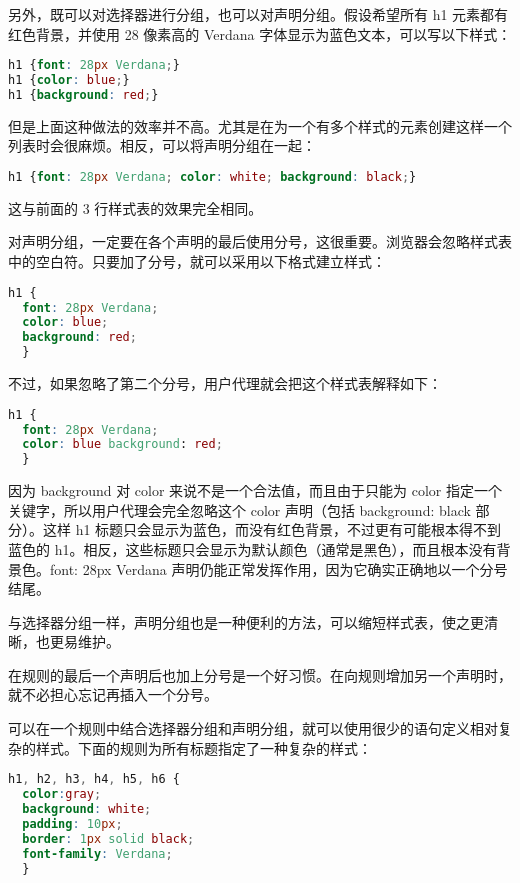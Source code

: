 另外，既可以对选择器进行分组，也可以对声明分组。假设希望所有 h1 元素都有红色背景，并使用 28 像素高的 Verdana 字体显示为蓝色文本，可以写以下样式：

\begin{lstlisting}[language=CSS]
h1 {font: 28px Verdana;}
h1 {color: blue;}
h1 {background: red;}
\end{lstlisting}


但是上面这种做法的效率并不高。尤其是在为一个有多个样式的元素创建这样一个列表时会很麻烦。相反，可以将声明分组在一起：

\begin{lstlisting}[language=CSS]
h1 {font: 28px Verdana; color: white; background: black;}
\end{lstlisting}


这与前面的 3 行样式表的效果完全相同。

对声明分组，一定要在各个声明的最后使用分号，这很重要。浏览器会忽略样式表中的空白符。只要加了分号，就可以采用以下格式建立样式：

\begin{lstlisting}[language=CSS]
h1 {
  font: 28px Verdana;
  color: blue;
  background: red;
  }
\end{lstlisting}

不过，如果忽略了第二个分号，用户代理就会把这个样式表解释如下：

\begin{lstlisting}[language=CSS]
h1 {
  font: 28px Verdana;
  color: blue background: red;
  }
\end{lstlisting}


因为 background 对 color 来说不是一个合法值，而且由于只能为 color 指定一个关键字，所以用户代理会完全忽略这个 color 声明（包括 background: black 部分）。这样 h1 标题只会显示为蓝色，而没有红色背景，不过更有可能根本得不到蓝色的 h1。相反，这些标题只会显示为默认颜色（通常是黑色），而且根本没有背景色。font: 28px Verdana 声明仍能正常发挥作用，因为它确实正确地以一个分号结尾。

与选择器分组一样，声明分组也是一种便利的方法，可以缩短样式表，使之更清晰，也更易维护。


在规则的最后一个声明后也加上分号是一个好习惯。在向规则增加另一个声明时，就不必担心忘记再插入一个分号。

可以在一个规则中结合选择器分组和声明分组，就可以使用很少的语句定义相对复杂的样式。下面的规则为所有标题指定了一种复杂的样式：


\begin{lstlisting}[language=CSS]
h1, h2, h3, h4, h5, h6 {
  color:gray;
  background: white;
  padding: 10px;
  border: 1px solid black;
  font-family: Verdana;
  }
\end{lstlisting}



